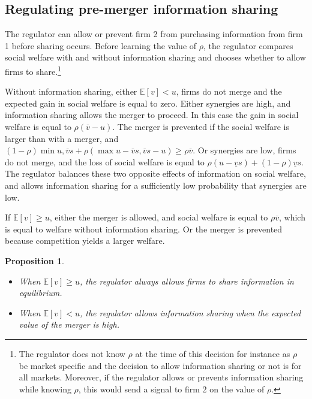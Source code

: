 \documentclass[a4paper,leqno]{article}%
\newtheorem{prop}{Proposition}
\newcommand{\E}{\mathbb E}
\newcommand{\uv}{\underline{v}}
\newcommand{\ov}{\overline{v}}
\begin{document}
\medskip

\subsection{Regulating pre-merger information sharing}

The regulator can allow or prevent firm 2 from purchasing information from firm 1 before sharing occurs. Before learning the value of $\rho$, the regulator compares social welfare with and without information sharing and chooses whether to allow firms to share.\footnote{The regulator does not know $\rho$ at the time of this decision for instance as $\rho$ be market specific and the decision to allow information sharing or not is for all markets. Moreover, if the regulator allows or prevents information sharing while knowing $\rho$, this would send a signal to firm 2 on the value of $\rho$.}

\medskip

Without information sharing, either $\E[v]<u$, firms do not merge and the expected gain in social welfare is equal to zero. Either synergies are high, and information sharing allows the merger to proceed. In this case the gain in social welfare is equal to $\rho (\ov-u)$. The merger is prevented if the social welfare is larger than with a merger, and $(1-\rho)\min{u,\ov s}+\rho (\max{u-\ov s,\ov s-u})\geq \rho \ov$. Or synergies are low, firms do not merge, and the loss of social welfare is equal to $\rho (u-\uv s)+(1-\rho)\uv s$. The regulator balances these two opposite effects of information on social welfare, and allows information sharing for a sufficiently low probability that synergies are low.

\medskip

If $\E[v]\geq u$, either the merger is allowed, and social welfare is equal to $\rho \ov$, which is equal to welfare without information sharing. Or the merger is prevented because competition yields a larger welfare.

\medskip


\begin{prop}~~

\begin{itemize}
    \item When $\E[v]\geq u$, the regulator always allows firms to share information in equilibrium.
    \item When $\E[v]< u$, the regulator allows information sharing when the expected value of the merger is high.
\end{itemize}


\end{prop}
\end{document}
